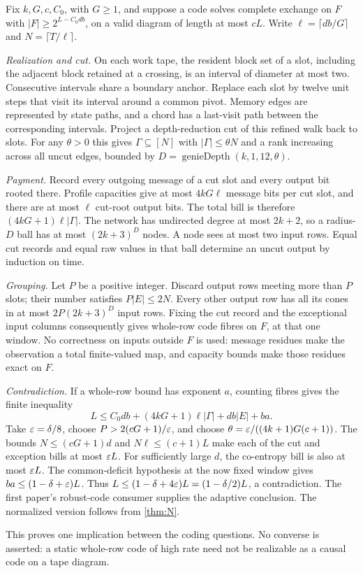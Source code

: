 \begin{outline}
Fix $k,G,c,C_0$, with $G\ge1$, and suppose a code solves complete exchange on $F$ with
$|F|\ge2^{L-C_0db}$, on a valid diagram of length at most $cL$. Write $\ell=\lceil db/G\rceil$ and
$N=\lceil T/\ell\rceil$.

\emph{Realization and cut.} On each work tape, the resident block set of a slot, including the adjacent block
retained at a crossing, is an interval of diameter at most two. Consecutive intervals share a boundary anchor. Replace each slot by twelve unit steps that
visit its interval around a common pivot. Memory edges are represented by state paths, and a chord has a
last-visit path between the corresponding intervals. Project a depth-reduction cut of this refined walk back to
slots. For any $\theta>0$ this gives $\Gamma\subseteq[N]$ with $|\Gamma|\le\theta N$ and a rank increasing across
all uncut edges, bounded by $D=\operatorname{genieDepth}(k,1,12,\theta)$.

\emph{Payment.} Record every outgoing message of a cut slot and every output bit rooted there. Profile capacities
give at most $4kG\ell$ message bits per cut slot, and there are at most $\ell$ cut-root output bits. The total bill
is therefore $(4kG+1)\ell|\Gamma|$. The network has undirected degree at most $2k+2$, so a radius-$D$ ball has at
most $(2k+3)^D$ nodes. A node sees at most two input rows. Equal cut records and equal raw values in that ball
determine an uncut output by induction on time.

\emph{Grouping.} Let $P$ be a positive integer. Discard output rows meeting more than $P$ slots; their number
satisfies $P|E|\le2N$. Every other output row has all its cones in at most $2P(2k+3)^D$ input rows. Fixing the
cut record and the exceptional input columns consequently gives whole-row code fibres on $F$, at that one window.
No correctness on inputs outside $F$ is used: message residues make the observation a total finite-valued map,
and capacity bounds make those residues exact on $F$.

\emph{Contradiction.} If a whole-row bound has exponent $a$, counting fibres gives the finite inequality
\begin{equation}\label{eq:block-invoice}
 L\le C_0db+(4kG+1)\ell|\Gamma|+db|E|+ba.
\end{equation}
Take $\varepsilon=\delta/8$, choose $P>2(cG+1)/\varepsilon$, and choose
$\theta=\varepsilon/((4k+1)G(c+1))$. The bounds $N\le(cG+1)d$ and $N\ell\le(c+1)L$ make each of the cut and
exception bills at most $\varepsilon L$. For sufficiently large $d$, the co-entropy bill is also at most $\varepsilon L$.
The common-deficit hypothesis at the now fixed window gives $ba\le(1-\delta+\varepsilon)L$. Thus
$L\le(1-\delta+4\varepsilon)L=(1-\delta/2)L$, a contradiction. The first paper's robust-code consumer supplies the
adaptive conclusion. The normalized version follows from \cref{thm:N}.
\end{outline}

This proves one implication between the coding questions. No converse is asserted: a static whole-row code of
high rate need not be realizable as a causal code on a tape diagram.
